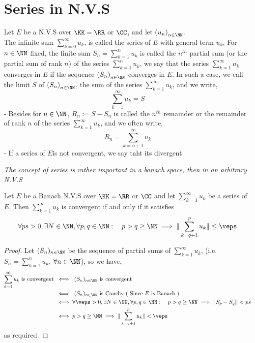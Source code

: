 % 

\lecday[2025-03-13]

% 

\section{Series in N.V.S}
\begin{definition}[]
Let $E $ be a N.V.S over $\KK=\RR  $ or $\CC  $, 
and let $ \left( u_{n} \right)_{n \in \NN} $. \\
The infinite sum $\sum_{k=0}^{\infty } u_{k} $, 
is called the series of $E $ with general term
$u_{k} $, For $n \in \NN $ fixed,
the finite sum $S_{n}= \sum_{k=1}^{n} u_{k} $ 
is called the $n^{th} $ partial sum (or the partial
sum of rank $n $) of the series
$\sum_{k=1}^{n} u_{k} $, we say that 
the series $\sum_{k=1}^{\infty }  u_{k}$  
converges in $E $ if the sequence $\left( S_{n} \right)_{n
\in  \NN} $ converges in $E $, In such a case, we call 
the limit $S $ of 
$\left( S_{n} \right)_{n
\in  \NN} $, the sum 
of the series $\sum_{k=1}^{\infty }u_{k}$,
and we write,
\[
\sum_{k=1}^{\infty } 
u_{k} = S
\]
- Besides for $n \in \NN $, 
$R_{n} := S - S_{n} $ is called
the $n^{th} $  remainder 
or the remainder of rank $n $ of 
the series $\sum_{k=1}^{\infty } u_{k} $,
and we often write,
\[
	R_{n} =
	\sum_{k=n+1}^{\infty } 
	u_{k}
\]
- If a series of $E $is not 
convergent, we say taht its divergent
\end{definition}
\divider
\it The concept of series is rather
important in a banach space, then
in an arbitrary N.V.S
\normalfont
\divider
\begin{definition}
	Let $E $ be a Banach N.V.S over 
	$\KK = \RR  $ or $\CC  $ and 
	let $\sum_{k=1}^{\infty } u_{k} $ be 
	a series of $E $. Then 
	$\sum_{k=1}^{\infty } u_{k} $ is
	convergent if and only if it satisfies
	\[
	\forall  ps > 0,
	\exists  N \in \NN, 
	\forall p,q \in \NN : 
	\quad p> q \geq \NN \implies 
	\| \sum_{k=q+1}^{p} u_{k} \|  \leq \veps 
	\]
\end{definition}
\begin{proof}
Let $(S_n )_{n \in \NN} $ be the sequence
of partial sums of $\sum_{k=1}^{\infty } 
u_{k}$, (i.e. $S_{n} = 
\sum_{k=1}^{n} u_{k}$, $\forall n \in \NN $), 
so we have, 
\begin{align*}
\sum_{k=1}^{\infty }  
u_{k} \text{ is convergent }  & \iff 
\text{ $ (S_{n})_{n \in \NN} $ is convergent }  \\
			      & \iff 
\text{ $ (S_n) _{n \in \NN} $ is Cauchy 
 }  \hfill \text{( Since $E $ is Banach )}  \\
			      & \iff 
	     \forall \veps > 0,
	     \exists  N \in \NN, 
	     \forall p,q \in \NN :
	     \quad  p > q \geq \NN \implies 
	     \| S_{p} - S_{q} \|  < ps
	     \\
			      & \iff 
	p > q \geq \NN \implies 
	\| \sum_{k=q+1}^{p} u_{k} \|  
	< \veps 
\end{align*}
as required. 
\end{proof}
\newpage

